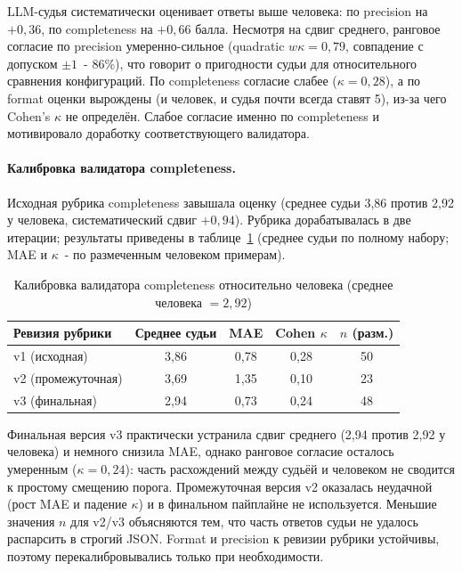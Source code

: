 \documentclass[a4paper,12pt]{article}
\begin{document}
LLM-судья систематически оценивает ответы выше человека: по precision на $+0{,}36$, по completeness на $+0{,}66$ балла. Несмотря на сдвиг среднего, ранговое согласие по precision умеренно-сильное (quadratic $w\kappa = 0{,}79$, совпадение с допуском $\pm 1$~- 86\%), что говорит о пригодности судьи для относительного сравнения конфигураций. По completeness согласие слабее ($\kappa = 0{,}28$), а по format оценки вырождены (и человек, и судья почти всегда ставят 5), из-за чего Cohen's $\kappa$ не определён. Слабое согласие именно по completeness и мотивировало доработку соответствующего валидатора.

\paragraph{Калибровка валидатора completeness.}

Исходная рубрика completeness завышала оценку (среднее судьи 3,86 против 2,92 у человека, систематический сдвиг $+0{,}94$). Рубрика дорабатывалась в две итерации; результаты приведены в таблице~\ref{tab:judge_calibration} (среднее судьи по полному набору; MAE и $\kappa$~- по размеченным человеком примерам).

\begin{table}[H]
\centering
\caption{Калибровка валидатора completeness относительно человека (среднее человека $=2{,}92$)}
\label{tab:judge_calibration}
\renewcommand{\arraystretch}{1.2}
\begin{tabular}{lcccc}
\hline
\textbf{Ревизия рубрики} & \textbf{Среднее судьи} & \textbf{MAE} & \textbf{Cohen $\kappa$} & \textbf{$n$ (разм.)} \\
\hline
v1 (исходная) & 3,86 & 0,78 & 0,28 & 50 \\
v2 (промежуточная) & 3,69 & 1,35 & 0,10 & 23 \\
v3 (финальная) & 2,94 & 0,73 & 0,24 & 48 \\
\hline
\end{tabular}
\end{table}
\FloatBarrier

Финальная версия v3 практически устранила сдвиг среднего (2,94 против 2,92 у человека) и немного снизила MAE, однако ранговое согласие осталось умеренным ($\kappa = 0{,}24$): часть расхождений между судьёй и человеком не сводится к простому смещению порога. Промежуточная версия v2 оказалась неудачной (рост MAE и падение $\kappa$) и в финальном пайплайне не используется. Меньшие значения $n$ для v2/v3 объясняются тем, что часть ответов судьи не удалось распарсить в строгий JSON. Format и precision к ревизии рубрики устойчивы, поэтому перекалибровывались только при необходимости.
\end{document}
